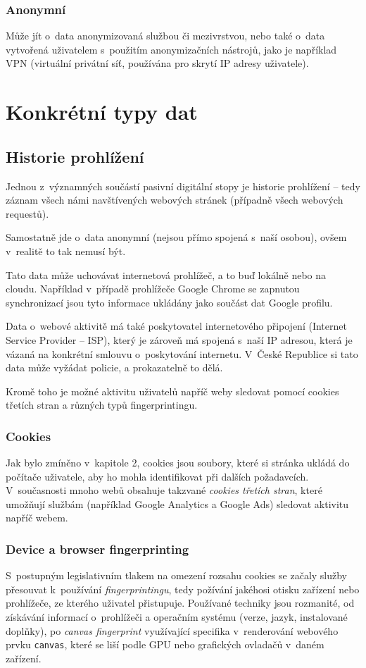 \subsubsection*{Anonymní}

Může jít o~data anonymizovaná službou či mezivrstvou, nebo také o~data vytvořená uživatelem s~použitím anonymizačních nástrojů, jako je například VPN (virtuální privátní síť, používána pro skrytí IP adresy uživatele).

\section{Konkrétní typy dat}

\subsection{Historie prohlížení}
Jednou z~významných součástí pasivní digitální stopy je historie prohlížení -- tedy záznam všech námi navštívených webových stránek (případně všech webových requestů).


Samostatně jde o~data anonymní (nejsou přímo spojená s~naší osobou), ovšem v~realitě to tak nemusí být.

Tato data může uchovávat internetová prohlížeč, a to buď lokálně nebo na cloudu. Například v~případě prohlížeče Google Chrome se zapnutou synchronizací jsou tyto informace ukládány jako součást dat Google profilu.

Data o~webové aktivitě má také poskytovatel internetového připojení (Internet Service Provider -- ISP), který je zároveň má spojená s~naší IP adresou, která je vázaná na konkrétní smlouvu o~poskytování internetu. V~České Republice si tato data může vyžádat policie, a prokazatelně to dělá\citep{policie-isp}.

Kromě toho je možné aktivitu uživatelů napříč weby sledovat pomocí cookies třetích stran a různých typů fingerprintingu.
\subsubsection*{Cookies}
Jak bylo zmíněno v~kapitole 2, cookies jsou soubory, které si stránka ukládá do počítače uživatele, aby ho mohla identifikovat při dalších požadavcích. V~současnosti mnoho webů obsahuje takzvané \textit{cookies třetích stran}, které umožňují službám (například Google Analytics a Google Ads) sledovat aktivitu napříč webem.

\subsubsection*{Device a browser fingerprinting}
S~postupným legislativním tlakem na omezení rozsahu cookies se začaly služby přesouvat k~používání \textit{fingerprintingu}, tedy požívání jakéhosi otisku zařízení nebo prohlížeče, ze kterého uživatel přistupuje. Používané techniky jsou rozmanité, od získávání informací o~prohlížeči a operačním systému (verze, jazyk, instalované doplňky), po \textit{canvas fingerprint} využívající specifika v~renderování webového prvku \verb|canvas|, které se liší podle GPU nebo grafických ovladačů v~daném zařízení.  

